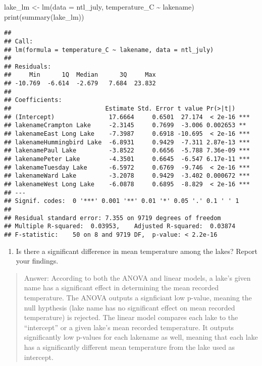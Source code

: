 \documentclass[
]{article}
\newenvironment{Shaded}{\begin{snugshade}}{\end{snugshade}}
\newcommand{\AttributeTok}[1]{\textcolor[rgb]{0.77,0.63,0.00}{#1}}
\newcommand{\FunctionTok}[1]{\textcolor[rgb]{0.00,0.00,0.00}{#1}}
\newcommand{\NormalTok}[1]{#1}
\newcommand{\OtherTok}[1]{\textcolor[rgb]{0.56,0.35,0.01}{#1}}
\newcommand{\SpecialCharTok}[1]{\textcolor[rgb]{0.00,0.00,0.00}{#1}}
\providecommand{\tightlist}{%
  \setlength{\itemsep}{0pt}\setlength{\parskip}{0pt}}
\begin{document}
\begin{Shaded}
\begin{Highlighting}[]
\NormalTok{lake\_lm }\OtherTok{\textless{}{-}} \FunctionTok{lm}\NormalTok{(}\AttributeTok{data =}\NormalTok{ ntl\_july, temperature\_C }\SpecialCharTok{\textasciitilde{}}\NormalTok{ lakename)}
\FunctionTok{print}\NormalTok{(}\FunctionTok{summary}\NormalTok{(lake\_lm))}
\end{Highlighting}
\end{Shaded}

\begin{verbatim}
## 
## Call:
## lm(formula = temperature_C ~ lakename, data = ntl_july)
## 
## Residuals:
##     Min      1Q  Median      3Q     Max 
## -10.769  -6.614  -2.679   7.684  23.832 
## 
## Coefficients:
##                          Estimate Std. Error t value Pr(>|t|)    
## (Intercept)               17.6664     0.6501  27.174  < 2e-16 ***
## lakenameCrampton Lake     -2.3145     0.7699  -3.006 0.002653 ** 
## lakenameEast Long Lake    -7.3987     0.6918 -10.695  < 2e-16 ***
## lakenameHummingbird Lake  -6.8931     0.9429  -7.311 2.87e-13 ***
## lakenamePaul Lake         -3.8522     0.6656  -5.788 7.36e-09 ***
## lakenamePeter Lake        -4.3501     0.6645  -6.547 6.17e-11 ***
## lakenameTuesday Lake      -6.5972     0.6769  -9.746  < 2e-16 ***
## lakenameWard Lake         -3.2078     0.9429  -3.402 0.000672 ***
## lakenameWest Long Lake    -6.0878     0.6895  -8.829  < 2e-16 ***
## ---
## Signif. codes:  0 '***' 0.001 '**' 0.01 '*' 0.05 '.' 0.1 ' ' 1
## 
## Residual standard error: 7.355 on 9719 degrees of freedom
## Multiple R-squared:  0.03953,    Adjusted R-squared:  0.03874 
## F-statistic:    50 on 8 and 9719 DF,  p-value: < 2.2e-16
\end{verbatim}

\begin{enumerate}
\def\labelenumi{\arabic{enumi}.}
\setcounter{enumi}{12}
\tightlist
\item
  Is there a significant difference in mean temperature among the lakes?
  Report your findings.
\end{enumerate}

\begin{quote}
Answer: According to both the ANOVA and linear models, a lake's given
name has a significant effect in determining the mean recorded
temperature. The ANOVA outputs a signficiant low p-value, meaning the
null hypthesis (lake name has no significant effect on mean recorded
temperature) is rejected. The linear model compares each lake to the
``intercept'' or a given lake's mean recorded temperature. It outputs
significantly low p-values for each lakename as well, meaning that each
lake has a significantly different mean temperature from the lake used
as intercept.
\end{quote}
\end{document}

